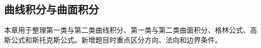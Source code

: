 \subsection{曲线积分与曲面积分}

\begin{knowledgeBox}
本章用于整理第一类与第二类曲线积分、第一类与第二类曲面积分、格林公式、高斯公式和斯托克斯公式。新增题目时重点区分方向、法向和边界条件。
\end{knowledgeBox}
